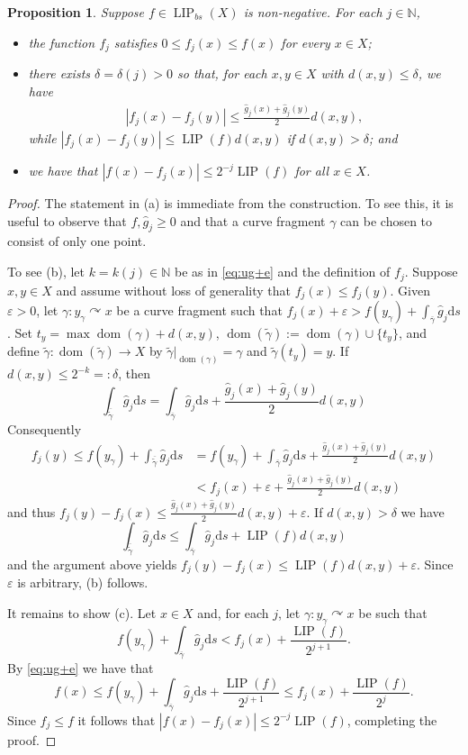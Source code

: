 \documentclass{amsart}
\newtheorem{proposition}[theorem]{Proposition}
\numberwithin{equation}{section}
\newcommand{\N}{\mathbb{N}}
\newcommand{\LIP}{\operatorname{LIP}}
\newcommand{\dom}{\operatorname{dom}}
\newcommand{\ud}{\mathrm {d}}
\newcommand{\defr}{=\mathrel{\mathop:}}
\begin{document}
\begin{proposition}\label{prop:fjm}
Suppose $f\in \LIP_{bs}(X)$ is non-negative. For each $j\in\N$,
\begin{itemize}
\item[(a)] the function $f_j$ satisfies $0\le f_j(x)\le f(x)$ for every $x\in X$;
\item[(b)] there exists $\delta=\delta(j)>0$ so that, for each $x,y\in X$ with $d(x,y)\le \delta$, we have
\begin{align*}
    |f_j(x)-f_j(y)|\le \frac{\hat g_j(x)+\hat g_j(y)}{2}d(x,y),
\end{align*}
while $|f_j(x)-f_j(y)|\le \LIP(f)d(x,y)$ if $d(x,y)>\delta$; and
\item[(c)] we have that $|f(x)-f_j(x)|\le 2^{-j}\LIP(f)$ for all $x\in X$.
\end{itemize}
\end{proposition}
\begin{proof}
The statement in (a) is immediate from the construction. To see this, it is useful to observe that $f,\hat{g}_j\geq 0$ and that a curve fragment $\gamma$ can be chosen to consist of only one point.

To see (b), let $k=k(j)\in\N$ be as in \eqref{eq:ug+e} and the definition of $f_j$. Suppose $x,y\in X$ and assume without loss of generality that $f_j(x)\le f_j(y)$. Given $\varepsilon>0$, let $\gamma:y_\gamma\curvearrowright x$ be a curve fragment such that $f_j(x)+\varepsilon> f(y_\gamma)+\int_{\overline{\gamma}} \hat g_j\ud s$. Set $t_y=\max\dom(\gamma)+d(x,y)$, $\dom(\tilde\gamma):=\dom(\gamma)\cup\{t_y\}$, and define $\tilde\gamma:\dom(\tilde\gamma)\to X$ by $\tilde\gamma|_{\dom(\gamma)}=\gamma$ and $\tilde\gamma(t_y)=y$. If $d(x,y)\le 2^{-k}\defr \delta$, then
\[
\int_{\overline{\tilde\gamma}}\hat g_j\ud s=\int_{\overline\gamma}\hat g_j\ud s+\frac{\hat g_j(x)+\hat g_j(y)}{2}d(x,y)
\]
Consequently
\begin{align*}
f_j(y)\le f(y_\gamma)+\int_{\overline{\tilde\gamma}}\hat g_j\ud s&=f(y_\gamma)+\int_{\overline\gamma}\hat g_j\ud s+\frac{\hat g_j(x)+\hat g_j(y)}{2}d(x,y)\\
&<f_j(x)+\varepsilon+\frac{\hat g_j(x)+\hat g_j(y)}{2}d(x,y)
\end{align*}
and thus $f_j(y)-f_j(x)\le \frac{\hat g_j(x)+\hat g_j(y)}{2}d(x,y)+\varepsilon$. If $d(x,y)> \delta$ we have 
\[
\int_{\overline{\tilde\gamma}}\hat g_j\ud s\le \int_{\overline\gamma}\hat g_j\ud s+\LIP(f)d(x,y)
\]
and the argument above yields $f_j(y)-f_j(x)\le \LIP(f)d(x,y)+\varepsilon$. Since $\varepsilon$ is arbitrary, (b) follows.

It remains to show (c). Let $x\in X$ and, for each $j$, let $\gamma:y_\gamma\curvearrowright x$ be such that
\[f(y_\gamma)+\int_{\overline\gamma}\hat g_j\ud s<f_j(x)+\frac{\LIP(f)}{2^{j+1}}.\]
By \eqref{eq:ug+e} we have that
\[
f(x)\le f(y_\gamma)+\int_{\overline\gamma}\hat g_j\ud s+\frac{\LIP(f)}{2^{j+1}}\le f_j(x)+\frac{\LIP(f)}{2^{j}}.
\]
Since $f_j\le f$ it follows that $|f(x)-f_j(x)|\le 2^{-j}\LIP(f)$, completing the proof.
\end{proof}
\end{document}
